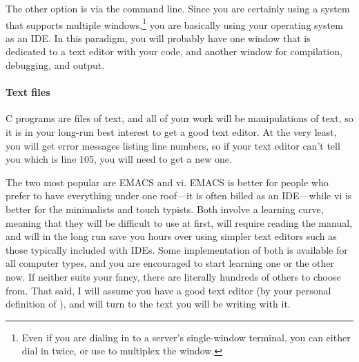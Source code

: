 \documentclass[12pt]{article}
\def\ind#1{\index{#1}#1}
\begin{document}
The other option is via the command line. Since you are certainly using
a system that supports multiple windows,\footnote{Even if you are
dialing in to a server's single-window terminal, you can either dial in
twice, or use  to multiplex the window.} 
you are basically using your operating system as an IDE.
In this paradigm, you will probably have one window that is dedicated to
a text editor with your code, and another window for compilation,
debugging, and output.



\paragraph{Text files} C programs are files of text, and all of your work
will be manipulations of text, so it is in your long-run best interest to
get a good \ind{text editor}. At the very least, you will get error messages
listing line numbers, so if your text editor can't tell you which is
line 105, you will need to get a new one.

The two most popular are \ind{EMACS} and \ind{vi}. EMACS is better for
people who prefer to have everything under one roof---it is often billed
as an IDE---while vi is better for the minimalists and touch typists. Both
involve a learning curve, meaning that they will be difficult to use at
first, will require reading the manual, and will in the long run save
you hours over using simpler text editors such as those typically
included with IDEs. Some implementation of both is available for all
computer types, and you are encouraged to start learning one or the other
now. If neither suits your fancy, there are literally hundreds of others
to choose from. That said, I will assume you have a good text editor
(by your personal definition of ), and will turn to the text you
will be writing with it.
\ifbook \else 
	
\fi
\end{document}
